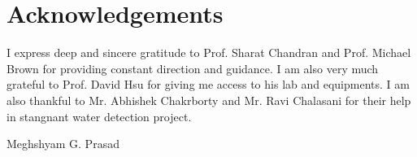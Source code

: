 \documentclass[11pt]{article}
\begin{document}
\def\title{Quadcopter Based Applications in Imaging}
\def\what{Third Annual Progress Report}
\def\degree{Doctor of Philosophy}
\def\who{Meghshyam G. Prasad}
\def\roll{124058001}
\def\guide{Prof. Sharat Chandran \\ Prof. Michael Brown}
\titlpage
\def\bsq{\begin{flushright} $\blacksquare$\\ \end{flushright}}
\def\tab{\hspace{5mm}}

\newpage
\section*{Acknowledgements}
I express deep and sincere gratitude to Prof. Sharat Chandran and Prof.
Michael Brown for providing constant direction and guidance. I am also
very much grateful to Prof. David Hsu for giving me access to his lab and
equipments. I am also thankful to Mr. Abhishek Chakrborty and Mr. Ravi Chalasani
for their help in stangnant water detection project.

\begin{flushright}
Meghshyam G. Prasad
\end{flushright}
\end{document}
